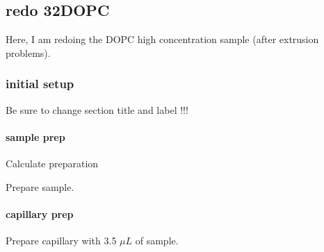 \subsection{redo 32\mM DOPC}\label{sec:concissues_dopc32mMredo}
Here, I am redoing the DOPC high concentration sample (after extrusion problems).

\subsubsection{initial setup}
Be sure to change section title and label !!!

\paragraph{sample prep}
Calculate preparation

Prepare sample.

\paragraph{capillary prep}
Prepare capillary with 3.5 $\mu L$ of sample.

